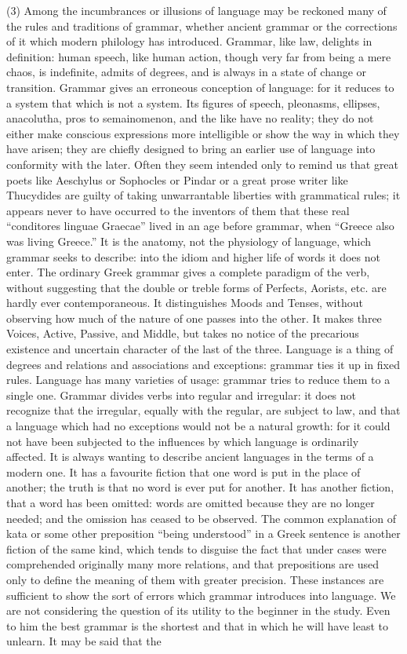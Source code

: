 \documentclass[11pt,letter]{article}
\begin{document}
\par  (3) Among the incumbrances or illusions of language may be reckoned many of the rules and traditions of grammar, whether ancient grammar or the corrections of it which modern philology has introduced. Grammar, like law, delights in definition: human speech, like human action, though very far from being a mere chaos, is indefinite, admits of degrees, and is always in a state of change or transition. Grammar gives an erroneous conception of language: for it reduces to a system that which is not a system. Its figures of speech, pleonasms, ellipses, anacolutha, pros to semainomenon, and the like have no reality; they do not either make conscious expressions more intelligible or show the way in which they have arisen; they are chiefly designed to bring an earlier use of language into conformity with the later. Often they seem intended only to remind us that great poets like Aeschylus or Sophocles or Pindar or a great prose writer like Thucydides are guilty of taking unwarrantable liberties with grammatical rules; it appears never to have occurred to the inventors of them that these real “conditores linguae Graecae” lived in an age before grammar, when “Greece also was living Greece.” It is the anatomy, not the physiology of language, which grammar seeks to describe: into the idiom and higher life of words it does not enter. The ordinary Greek grammar gives a complete paradigm of the verb, without suggesting that the double or treble forms of Perfects, Aorists, etc. are hardly ever contemporaneous. It distinguishes Moods and Tenses, without observing how much of the nature of one passes into the other. It makes three Voices, Active, Passive, and Middle, but takes no notice of the precarious existence and uncertain character of the last of the three. Language is a thing of degrees and relations and associations and exceptions: grammar ties it up in fixed rules. Language has many varieties of usage: grammar tries to reduce them to a single one. Grammar divides verbs into regular and irregular: it does not recognize that the irregular, equally with the regular, are subject to law, and that a language which had no exceptions would not be a natural growth: for it could not have been subjected to the influences by which language is ordinarily affected. It is always wanting to describe ancient languages in the terms of a modern one. It has a favourite fiction that one word is put in the place of another; the truth is that no word is ever put for another. It has another fiction, that a word has been omitted: words are omitted because they are no longer needed; and the omission has ceased to be observed. The common explanation of kata or some other preposition “being understood” in a Greek sentence is another fiction of the same kind, which tends to disguise the fact that under cases were comprehended originally many more relations, and that prepositions are used only to define the meaning of them with greater precision. These instances are sufficient to show the sort of errors which grammar introduces into language. We are not considering the question of its utility to the beginner in the study. Even to him the best grammar is the shortest and that in which he will have least to unlearn. It may be said that the 
\end{document}
